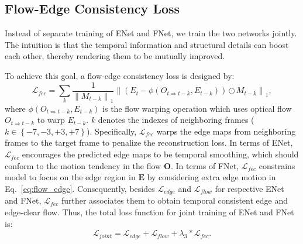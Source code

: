 \subsection{Flow-Edge Consistency Loss}
Instead of separate training of ENet and FNet, we train the two networks jointly.
The intuition is that the temporal information and structural details can boost each other, thereby rendering them to be mutually improved.

To achieve this goal, a flow-edge consistency loss is designed by:
\begin{equation}
\label{eq:flow_edge}
\mathcal{L}_{fec}=\sum_{k}\frac{1}{\left\|M_{t-k} \right\|_1}\left\|(E_{t}-\phi(O_{t\Rightarrow t-k},E_{t-k}))\odot M_{t-k}\right\|_1,
\end{equation}
where $\phi(O_{t\Rightarrow t-k},E_{t-k})$ is the flow warping operation which uses optical flow $O_{t\Rightarrow t-k}$ to warp $E_{t-k}$.
$k$ denotes the indexes of neighboring frames ($k\in \left\{-7,-3,+3,+7 \right\}$). 
Specifically, $\mathcal{L}_{fec}$ warps the edge maps from neighboring frames to the target frame to penalize the reconstruction loss.
In terms of ENet, $\mathcal{L}_{fec}$ encourages the predicted edge maps to be temporal smoothing, which should conform to the motion tendency in the flow $\boldsymbol{O}$. 
In terms of FNet, $\mathcal{L}_{fec}$ constrains model to focus on the edge region in $\boldsymbol{E}$ by considering extra edge motion in Eq.~\ref{eq:flow_edge}. 
Consequently, besides $\mathcal{L}_{edge}$ and $\mathcal{L}_{flow}$ for respective ENet and FNet, $\mathcal{L}_{fec}$ further associates them to obtain temporal consistent edge and edge-clear flow.
Thus, the total loss function for joint training of ENet and FNet is:
\begin{equation}
\label{eq:flow}
\mathcal{L}_{joint}=\mathcal{L}_{edge}+\mathcal{L}_{flow}+\lambda_3 * \mathcal{L}_{fec}.
\end{equation}







